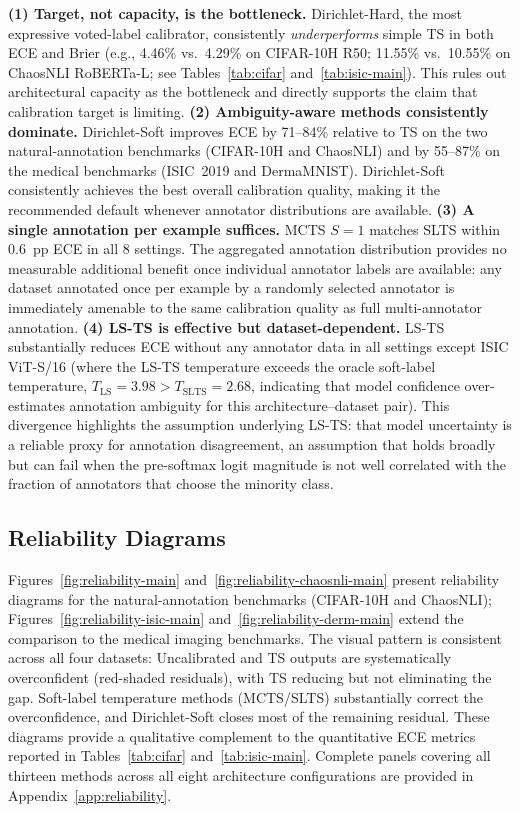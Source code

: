 \documentclass[10pt,journal,compsoc]{IEEEtran}
\begin{document}
\noindent\textbf{(1) Target, not capacity, is the bottleneck.}
Dirichlet-Hard, the most expressive voted-label calibrator, consistently \emph{underperforms} simple TS in both ECE and Brier (e.g., 4.46\% vs.\ 4.29\% on CIFAR-10H R50; 11.55\% vs.\ 10.55\% on ChaosNLI RoBERTa-L; see Tables~\ref{tab:cifar} and~\ref{tab:isic-main}).  This rules out architectural capacity as the bottleneck and directly supports the claim that calibration target is limiting.
\noindent\textbf{(2) Ambiguity-aware methods consistently dominate.}
Dirichlet-Soft improves ECE by 71--84\% relative to TS on the two natural-annotation benchmarks (CIFAR-10H and ChaosNLI) and by 55--87\% on the medical benchmarks (ISIC~2019 and DermaMNIST).  Dirichlet-Soft consistently achieves the best overall calibration quality, making it the recommended default whenever annotator distributions are available.
\noindent\textbf{(3) A single annotation per example suffices.}
MCTS $S{=}1$ matches SLTS within 0.6~pp ECE in all 8 settings.  The aggregated annotation distribution provides no measurable additional benefit once individual annotator labels are available: any dataset annotated once per example by a randomly selected annotator is immediately amenable to the same calibration quality as full multi-annotator annotation.
\noindent\textbf{(4) LS-TS is effective but dataset-dependent.}
LS-TS substantially reduces ECE without any annotator data in all settings except ISIC ViT-S/16 (where the LS-TS temperature exceeds the oracle soft-label temperature, $T_\text{LS}=3.98 > T_\text{SLTS}=2.68$, indicating that model confidence over-estimates annotation ambiguity for this architecture--dataset pair).
This divergence highlights the assumption underlying LS-TS: that model uncertainty is a reliable proxy for annotation disagreement, an assumption that holds broadly but can fail when the pre-softmax logit magnitude is not well correlated with the fraction of annotators that choose the minority class.

\subsection{Reliability Diagrams}
\label{sec:reliability}

Figures~\ref{fig:reliability-main} and~\ref{fig:reliability-chaosnli-main} present reliability diagrams for the natural-annotation benchmarks (CIFAR-10H and ChaosNLI); Figures~\ref{fig:reliability-isic-main} and~\ref{fig:reliability-derm-main} extend the comparison to the medical imaging benchmarks.  The visual pattern is consistent across all four datasets: Uncalibrated and TS outputs are systematically overconfident (red-shaded residuals), with TS reducing but not eliminating the gap.  Soft-label temperature methods (MCTS/SLTS) substantially correct the overconfidence, and Dirichlet-Soft closes most of the remaining residual.  These diagrams provide a qualitative complement to the quantitative ECE metrics reported in Tables~\ref{tab:cifar} and~\ref{tab:isic-main}.  Complete panels covering all thirteen methods across all eight architecture configurations are provided in Appendix~\ref{app:reliability}.
\end{document}

